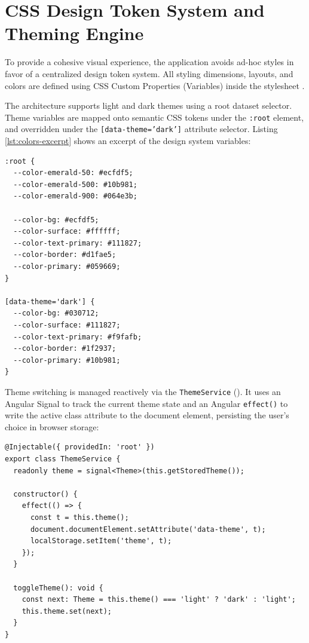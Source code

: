 \section{CSS Design Token System and Theming Engine}
To provide a cohesive visual experience, the application avoids ad-hoc styles in favor of a centralized design token system. All styling dimensions, layouts, and colors are defined using CSS Custom Properties (Variables) inside the  stylesheet \cite{mdnCssCustomProperties}. 

The architecture supports light and dark themes using a root dataset selector. Theme variables are mapped onto semantic CSS tokens under the \texttt{:root} element, and overridden under the \texttt{[data-theme='dark']} attribute selector. Listing \ref{lst:colors-excerpt} shows an excerpt of the design system variables:

\begin{lstlisting}[caption={Color Design Token overrides for Light and Dark themes}, label={lst:colors-excerpt}]
:root {
  --color-emerald-50: #ecfdf5;
  --color-emerald-500: #10b981;
  --color-emerald-900: #064e3b;
  
  --color-bg: #ecfdf5;
  --color-surface: #ffffff;
  --color-text-primary: #111827;
  --color-border: #d1fae5;
  --color-primary: #059669;
}

[data-theme='dark'] {
  --color-bg: #030712;
  --color-surface: #111827;
  --color-text-primary: #f9fafb;
  --color-border: #1f2937;
  --color-primary: #10b981;
}
\end{lstlisting}

Theme switching is managed reactively via the \texttt{ThemeService} (). It uses an Angular Signal to track the current theme state and an Angular \texttt{effect()} to write the active class attribute to the document element, persisting the user's choice in browser storage:

\begin{lstlisting}
@Injectable({ providedIn: 'root' })
export class ThemeService {
  readonly theme = signal<Theme>(this.getStoredTheme());

  constructor() {
    effect(() => {
      const t = this.theme();
      document.documentElement.setAttribute('data-theme', t);
      localStorage.setItem('theme', t);
    });
  }

  toggleTheme(): void {
    const next: Theme = this.theme() === 'light' ? 'dark' : 'light';
    this.theme.set(next);
  }
}
\end{lstlisting}

